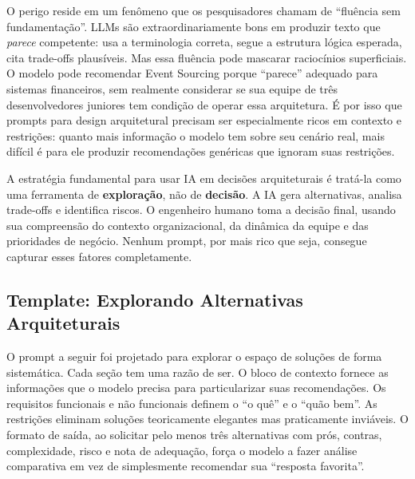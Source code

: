 O perigo reside em um fenômeno que os pesquisadores chamam de ``fluência sem
fundamentação''. LLMs são extraordinariamente bons em produzir texto que \textit
{parece} competente: usa a terminologia correta, segue a estrutura lógica esperada,
cita trade-offs plausíveis. Mas essa fluência pode mascarar raciocínios
superficiais. O modelo pode recomendar Event Sourcing porque ``parece'' adequado
para sistemas financeiros, sem realmente considerar se sua equipe de três
desenvolvedores juniores tem condição de operar essa arquitetura. É por isso que
prompts para design arquitetural precisam ser especialmente ricos em contexto e
restrições: quanto mais informação o modelo tem sobre seu cenário real, mais
difícil é para ele produzir recomendações genéricas que ignoram suas restrições.

A estratégia fundamental para usar IA em decisões arquiteturais é tratá-la como
uma ferramenta de \textbf{exploração}, não de \textbf{decisão}. A IA gera
alternativas, analisa trade-offs e identifica riscos. O engenheiro humano toma a
decisão final, usando sua compreensão do contexto organizacional, da dinâmica da
equipe e das prioridades de negócio. Nenhum prompt, por mais rico
que seja, consegue capturar esses fatores completamente.

\subsection{Template: Explorando Alternativas Arquiteturais}

O prompt a seguir foi projetado para explorar o espaço de soluções de forma
sistemática. Cada seção tem uma razão de ser. O bloco de contexto fornece as
informações que o modelo precisa para particularizar suas recomendações. Os
requisitos funcionais e não funcionais definem o ``o quê'' e o ``quão bem''. As
restrições eliminam soluções teoricamente elegantes mas praticamente inviáveis.
O formato de saída, ao solicitar pelo menos três alternativas com prós,
contras, complexidade, risco e nota de adequação, força o modelo a fazer
análise comparativa em vez de simplesmente recomendar sua ``resposta favorita''.

